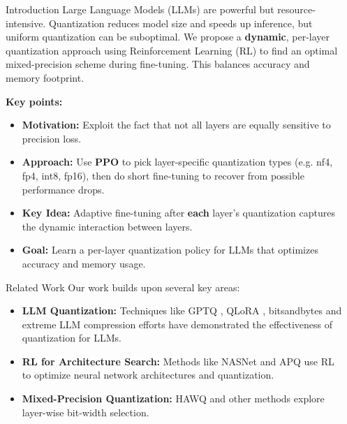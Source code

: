 \documentclass[final]{beamer}
\newlength{\sepwidth}
\newlength{\colwidth}
\newcommand{\separatorcolumn}{\begin{column}{\sepwidth}\end{column}}
\begin{document}
	\begin{frame}[t]
		\begin{columns}[t]
			\separatorcolumn
			
			\begin{column}{\colwidth}
				
				\begin{block}{Introduction}
					Large Language Models (LLMs) are powerful but resource-intensive. Quantization reduces model size and speeds up inference, but uniform quantization can be suboptimal. We propose a \textbf{dynamic}, per-layer quantization approach using Reinforcement Learning (RL) to find an optimal mixed-precision scheme during fine-tuning. This balances accuracy and memory footprint.
					
					\vspace{0.8em}
					\textbf{Key points:}
					\begin{itemize}
						\item \textbf{Motivation:} Exploit the fact that not all layers are equally sensitive to precision loss.
						\item \textbf{Approach:} Use \textbf{PPO} to pick layer-specific quantization types (e.g. nf4, fp4, int8, fp16), then do short fine-tuning to recover from possible performance drops.
						\item \textbf{Key Idea:} Adaptive fine-tuning after \textbf{each} layer's quantization captures the dynamic interaction between layers.
						\item \textbf{Goal:} Learn a per-layer quantization policy for LLMs that optimizes accuracy and memory usage.
					\end{itemize}
					
				\end{block}
				
				\begin{block}{Related Work}
					Our work builds upon several key areas:
					
					\begin{itemize}
						\item \textbf{LLM Quantization:} Techniques like GPTQ \cite{frantar2022gptq}, QLoRA \cite{dettmers2023qlora}, bitsandbytes \cite{dettmers2022llmint8} and extreme LLM compression efforts \cite{egiazarian2024extreme,malinovskii2024pvtuning} have demonstrated the effectiveness of quantization for LLMs.
						\item \textbf{RL for Architecture Search:} Methods like NASNet \cite{zoph2016neural} and APQ \cite{wang2020apq} use RL to optimize neural network architectures and quantization.
						\item \textbf{Mixed-Precision Quantization:} HAWQ \cite{dong2019hawq} and other methods explore layer-wise bit-width selection.
					\end{itemize}
					

\end{block}
\end{column}
\end{columns}
\end{frame}
\end{document}
